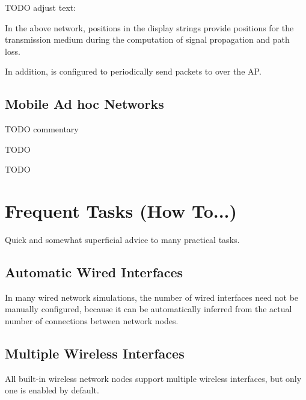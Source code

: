 TODO adjust text: 

In the above network, positions in the display strings provide 
positions for the transmission medium during the computation of 
signal propagation and path loss. 

In addition,  is configured to periodically send 
 packets to  over the AP.




\subsection{Mobile Ad hoc Networks}

TODO commentary


TODO


TODO



\section{Frequent Tasks (How To...)}

Quick and somewhat superficial advice to many practical tasks.

\subsection{Automatic Wired Interfaces}

In many wired network simulations, the number of wired interfaces need not
be manually configured, because it can be automatically inferred from the
actual number of connections between network nodes.


\subsection{Multiple Wireless Interfaces}

All built-in wireless network nodes support multiple wireless interfaces,
but only one is enabled by default.

